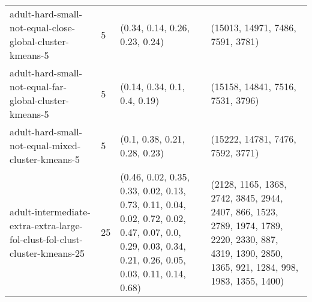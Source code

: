 \begin{longtable}{llll}
                                                     adult-hard-small-not-equal-close-global-cluster-kmeans-5 &              5 &                                                                                                                                                                                                                                                                            (0.34, 0.14, 0.26, 0.23, 0.24) &                                                                                                                                                                                                                                                                          (15013, 14971, 7486, 7591, 3781) \\
                                                       adult-hard-small-not-equal-far-global-cluster-kmeans-5 &              5 &                                                                                                                                                                                                                                                                              (0.14, 0.34, 0.1, 0.4, 0.19) &                                                                                                                                                                                                                                                                          (15158, 14841, 7516, 7531, 3796) \\
                                                            adult-hard-small-not-equal-mixed-cluster-kmeans-5 &              5 &                                                                                                                                                                                                                                                                             (0.1, 0.38, 0.21, 0.28, 0.23) &                                                                                                                                                                                                                                                                          (15222, 14781, 7476, 7592, 3771) \\
                                   adult-intermediate-extra-extra-large-fol-clust-fol-clust-cluster-kmeans-25 &             25 &                                                                                                                                                     (0.46, 0.02, 0.35, 0.33, 0.02, 0.13, 0.73, 0.11, 0.04, 0.02, 0.72, 0.02, 0.47, 0.07, 0.0, 0.29, 0.03, 0.34, 0.21, 0.26, 0.05, 0.03, 0.11, 0.14, 0.68) &                                                                                                                                                        (2128, 1165, 1368, 2742, 3845, 2944, 2407, 866, 1523, 2789, 1974, 1789, 2220, 2330, 887, 4319, 1390, 2850, 1365, 921, 1284, 998, 1983, 1355, 1400) \\

\end{longtable}
